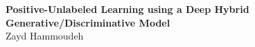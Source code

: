 \documentclass[10pt]{article}
\begin{document}
\begin{center}
  {\Large \textbf{Positive-Unlabeled Learning using a Deep Hybrid Generative/Discriminative Model}}
  \\\vspace{6pt}
  Zayd Hammoudeh
\end{center}








\end{document}
